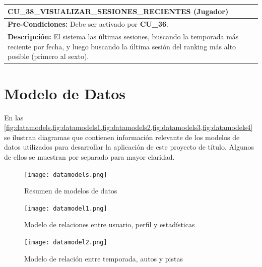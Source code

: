 \begin{center}
  \begin{tabular}{| p{7.5cm} | p{7.5cm} |}
    \hline
    \multicolumn{2}{|p{15cm}|}{\textbf{CU\_38\_VISUALIZAR\_SESIONES\_RECIENTES} (Jugador)} \\ \hline
    \multicolumn{2}{|p{15cm}|}{\textbf{Pre-Condiciones:} Debe ser activado por \textbf{CU\_36}.} \\ \hline
    \multicolumn{2}{|p{15cm}|}{\textbf{Descripción:} El sistema las últimas sesiones, buscando la temporada más reciente por fecha, y luego buscando la última sesión del ranking más alto posible (primero al sexto).} \\
    \hline
  \end{tabular}
  
  \label{table:usecase:38}
\end{center}

\newpage

\section{Modelo de Datos}
En las \cref{fig:datamodels,fig:datamodels1,fig:datamodels2,fig:datamodels3,fig:datamodels4} se ilustran diagramas que contienen información relevante de los modelos de datos utilizados para desarrollar la aplicación de este proyecto de título. Algunos de ellos se muestran por separado para mayor claridad.

\begin{figure}[H]
  \begin{center}
    \texttt{[image: datamodels.png]}
  \end{center}
  \caption[Resumen de modelo de datos]{Resumen de modelos de datos}
  \label{fig:datamodels}
\end{figure}

\begin{figure}[H]
  \begin{center}
    \texttt{[image: datamodel1.png]}
  \end{center}
  \caption[Modelo de relaciones entre usuario, perfil y estadísticas]{Modelo de relaciones entre usuario, perfil y estadísticas}
  \label{fig:datamodels1}
\end{figure}

\begin{figure}[H]
  \begin{center}
    \texttt{[image: datamodel2.png]}
  \end{center}
  \caption[Modelo de relación entre temporada, autos y pistas]{Modelo de relación entre temporada, autos y pistas}
  \label{fig:datamodels2}
\end{figure}

